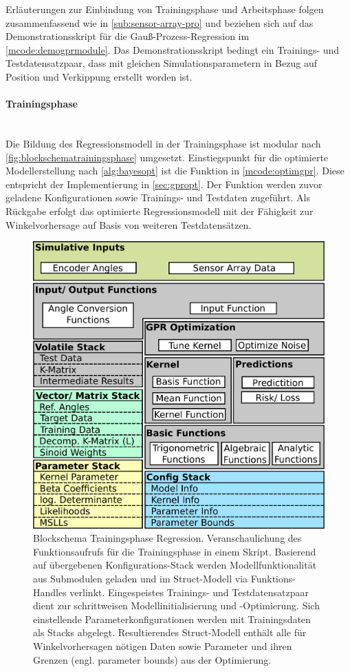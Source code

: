 Erläuterungen zur Einbindung von Trainingsphase und Arbeitsphase folgen zusammenfassend wie in \autoref{sub:sensor-array-pro} und beziehen sich auf das Demonstrationsskript für die Gauß-Prozess-Regression im \autoref{mcode:demogprmodule}. Das Demonstrationsskript bedingt ein Trainings- und Testdatensatzpaar, dass mit gleichen Simulationsparametern in Bezug auf Position und Verkippung erstellt worden ist.


\clearpage


\paragraph{Trainingsphase}\label{par:gpr-training-pro}$~$\\


Die Bildung des Regressionsmodell in der Trainingsphase ist modular nach \autoref{fig:blockschematrainingsphase} umgesetzt. Einstiegspunkt für die optimierte Modellerstellung nach \autoref{alg:bayesopt} ist die Funktion in \autoref{mcode:optimgpr}. Diese entspricht der Implementierung in \autoref{sec:gpropt}. Der Funktion werden zuvor geladene Konfigurationen sowie Trainings- und Testdaten zugeführt. Als Rückgabe erfolgt das optimierte Regressionsmodell mit der Fähigkeit zur Winkelvorhersage auf Basis von weiteren Testdatensätzen.


\vspace{3mm}
\begin{figure}[bph]
	\centering
	\includegraphics[width=.7\linewidth]{chapters/images/3-SW-E-OExp/Blockschema_Trainingsphase}
	\caption[Blockschema Trainingsphase Regression]{Blockschema Trainingsphase Regression. Veranschaulichung des Funktionsaufrufs für die Trainingsphase in einem Skript. Basierend auf übergebenen Konfigurations-Stack werden Modellfunktionalität aus Submodulen geladen und im Struct-Modell via Funktions-Handles verlinkt. Eingespeistes Trainings- und Testdatensatzpaar dient zur schrittweisen Modellinitialisierung und -Optimierung. Sich einstellende Parameterkonfigurationen werden mit Trainingsdaten als Stacks abgelegt. Resultierendes Struct-Modell enthält alle für Winkelvorhersagen nötigen Daten sowie Parameter und ihren Grenzen (engl. parameter bounds) aus der Optimierung.}
	\label{fig:blockschematrainingsphase}
\end{figure}


